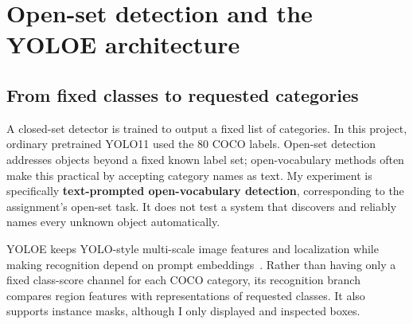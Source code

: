 \documentclass[10pt,letterpaper]{article}
\begin{document}
\newpage
\section{Open-set detection and the YOLOE architecture}
\subsection{From fixed classes to requested categories}
A closed-set detector is trained to output a fixed list of categories. In this project, ordinary pretrained YOLO11 used the 80 COCO labels. Open-set detection addresses objects beyond a fixed known label set; open-vocabulary methods often make this practical by accepting category names as text. My experiment is specifically \textbf{text-prompted open-vocabulary detection}, corresponding to the assignment's open-set task. It does not test a system that discovers and reliably names every unknown object automatically.

YOLOE keeps YOLO-style multi-scale image features and localization while making recognition depend on prompt embeddings~\cite{yoloepaper,yoloedocs}. Rather than having only a fixed class-score channel for each COCO category, its recognition branch compares region features with representations of requested classes. It also supports instance masks, although I only displayed and inspected boxes.

\begin{center}
\end{center}
\end{document}
